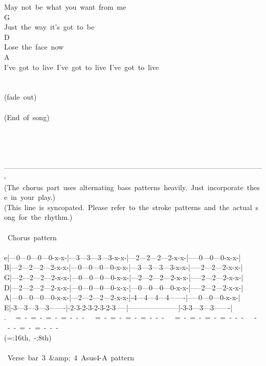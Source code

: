 {May\ not\ be\ what\ you\ want\ from\ me\\
G\\
Just\ the\ way\ it's\ got\ to\ be\\
D\\
Lose\ the\ face\ now\\
A\\
I've\ got\ to\ live\ I've\ got\ to\ live\ I've\ got\ to\ live\\
\\
\\
(fade\ out)\\
\\
(End\ of\ song)\\
\\
\\
\\
\\
-------------------------------------------------------------------------------------------------------------\\
(The\ chorus\ part\ uses\ alternating\ bass\ patterns\ heavily.\ Just\ incorporate\ these\ in\ your\ play.)\\
(This\ line\ is\ syncopated.\ Please\ refer\ to\ the\ stroke\ patterns\ and\ the\ actual\ song\ for\ the\ rhythm.)\\
\\
\lbrack\ Chorus\ pattern\rbrack\\
\\
e|---0---0---0---0-x-x-|---3---3---3---3-x-x-|---2---2---2---2-x-x-|-----0---0---0-x-x-|\\
B|---2---2---2---2-x-x-|---0---0---0---0-x-x-|---3---3---3---3-x-x-|-----2---2---2-x-x-|\\
G|---2---2---2---2-x-x-|---0---0---0---0-x-x-|---2---2---2---2-x-x-|-----2---2---2-x-x-|\\
D|---2---2---2---2-x-x-|---0---0---0---0-x-x-|---0---0---0---0-x-x-|-----2---2---2-x-x-|\\
A|---0---0---0---0-x-x-|---2---2---2---2-x-x-|-4---4---4---4-------|-----0---0---0-x-x-|\\
E|-3---3---3---3-------|-2-3-2-3-2-3-2-3-----|---------------------|-3-3---3---3-------|\\
. \ \ =\ -\ =\ -\ =\ -\ =\ -\ -\ -\ \ \ =\ -\ =\ -\ =\ -\ =\ -\ -\ -\ \ \ =\ -\ =\ -\ =\ -\ =\ -\ -\ -\ \ \ -\ -\ -\ =\ -\ =\ -\ -\ -\ \\
(=:16th,\ -:8th)\\
\\
\lbrack\ Verse\ bar\ 3\ \&amp;\ 4\ Asus4-A\ pattern\rbrack\\
}
